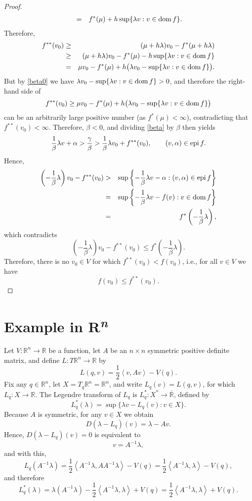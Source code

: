 \documentclass{article}
\newcommand{\inner}[2]{\left\langle #1, #2 \right\rangle}
\newcommand{\epi}{\ensuremath\mathrm{epi}\,}
\newcommand{\dom}{\ensuremath\mathrm{dom}\,}
\newcommand{\extreals}{\overline{\mathbb{R}}}
\theoremstyle{definition}
\begin{document}
\begin{proof}
\begin{eqnarray*}
&=&f^*(\mu)+h \sup\{\lambda v: v \in \dom f\}.
\end{eqnarray*}
Therefore,
\begin{eqnarray*}
f^{**}(v_0)&\geq&(\mu+h\lambda)v_0-f^*(\mu+h\lambda)\\
&\geq&(\mu+h\lambda)v_0-f^*(\mu)-h \sup\{\lambda v: v \in \dom f\}\\
&=&\mu v_0 - f^*(\mu) + h\big(\lambda v_0 - \sup\{\lambda v: v \in \dom f\}\big).
\end{eqnarray*}
But by  \eqref{beta0} we have $\lambda v_0 - \sup\{\lambda v: v \in \dom f\}>0$, and
therefore the right-hand side of 
\[
f^{**}(v_0) \geq \mu v_0 - f^*(\mu) + h\big(\lambda v_0 - \sup\{\lambda v: v \in \dom f\}\big)
\]
can be  an arbitrarily large positive number (as $f^*(\mu) < \infty$), contradicting
that $f^{**}(v_0)<\infty$. Therefore, $\beta<0$, and dividing \eqref{beta} by $\beta$  then yields
\[
\frac{1}{\beta} \lambda v + \alpha> \frac{\gamma}{\beta} > \frac{1}{\beta} \lambda v_0 + f^{**}(v_0), \qquad
(v,\alpha) \in \epi f.
\]
Hence,
\begin{eqnarray*}
\left(-\frac{1}{\beta}\lambda\right)v_0-f^{**}(v_0)&>&\sup\left\{-\frac{1}{\beta}\lambda v -\alpha: (v,\alpha) \in \epi f\right\}\\
&=&\sup\left\{ -\frac{1}{\beta} \lambda v - f(v): v\in \dom f \right\}\\
&=&f^*\left(-\frac{1}{\beta} \lambda \right),
\end{eqnarray*}
which contradicts 
\[
\left(-\frac{1}{\beta}\lambda\right)v_0 -f^{**}(v_0) \leq f^*\left(-\frac{1}{\beta} \lambda \right).
\]
Therefore, there is no $v_0 \in V$ for which $f^{**}(v_0)<f(v_0)$, i.e., for all $v \in V$ we have
\[
f(v_0) \leq f^{**}(v_0).
\]
 \end{proof}
 
\section{Example in \textbf{R}\textsuperscript{{\em n}}}
Let $V:\mathbb{R}^n \to \mathbb{R}$ be a function,
 let $A$ be an $n \times n$ symmetric positive definite matrix, 
and define $L:T\mathbb{R}^n \to \mathbb{R}$ by
\[
L(q,v) = \frac{1}{2}\inner{v}{Av} - V(q).
\]
Fix any $q \in \mathbb{R}^n$,  let $X = T_q \mathbb{R}^n = \mathbb{R}^n$, 
and write $L_q(v)=L(q,v)$, for which $L_q:X \to \mathbb{R}$. The Legendre transform of $L_q$ is
$L_q^*:X^* \to \extreals$, defined by
\[
L_q^*(\lambda) = \sup\{\lambda v - L_q(v): v \in X\}.
\]
Because $A$ is symmetric, for any $v \in X$ we obtain
\[
D(\lambda  -L_q)(v) = \lambda - Av.
\]
Hence, $D(\lambda - L_q)(v)=0$ is equivalent to 
\[
v = A^{-1} \lambda,
\]
and  with this,
\[
L_q(A^{-1}\lambda) = \frac{1}{2}\inner{A^{-1}\lambda}{AA^{-1}\lambda}-V(q) = \frac{1}{2}\inner{A^{-1}\lambda}{\lambda}-V(q),
\]
and therefore
\[
L_q^*(\lambda) = \lambda(A^{-1}\lambda)- \frac{1}{2}\inner{A^{-1}\lambda}{\lambda}+V(q) = \frac{1}{2}\inner{A^{-1}\lambda}{\lambda}+V(q).
\]
\end{document}

